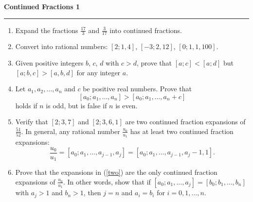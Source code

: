 \documentclass[12pt]{article}
\begin{document}
\begin{center}
{\bf \Large Continued Fractions 1}
\vspace{0.2cm}
\hrule
\end{center}

\begin{enumerate}
	\item Expand the fractions $\frac{17}{3}$ and $\frac{3}{17}$ into continued fractions.
	\vfill
	\item Convert into rational numbers: $[2; 1, 4]$, $[-3;2, 12]$, $[0;1, 1, 100]$.
	\vfill
	\item Given positive integers $b$, $c$, $d$ with $c>d$, prove that $[a; c]<[a; d]$ but $[a;b,c]>[a,b,d]$ for any integer $a$.
	\vfill
	\item Let $a_1, a_2, \ldots, a_n$ and $c$ be positive real numbers. Prove that
	\[
	[a_0; a_1, \ldots, a_n]>[a_0; a_1, \ldots, a_n+c]
	\]
	holds if $n$ is odd, but is false if $n$ is even.
	\vfill
	\item Verify that $[2;3, 7]$ and $[2;3,6,1]$ are two continued fraction expansions of $\frac{51}{52}$. In general, any rational number $\frac{u_0}{u_1}$ has at least two continued fraction expansions:
	\begin{equation}\label{two}
	\frac{u_0}{u_1} = [a_0; a_1, \ldots, a_{j-1}, a_j] = [a_0;a_1, \ldots, a_{j-1}, a_j-1, 1].
	\end{equation}
	\vfill
	\item Prove that the expansions in (\ref{two}) are the only continued fraction expansions of $\frac{u_0}{u_1}$. In other words, show that if $[a_0;a_1, \ldots, a_j] = [b_0;b_1,\ldots, b_n]$ with $a_j>1$ and $b_n>1$, then $j=n$ and $a_i=b_i$ for $i=0, 1, \ldots, n$.
	\vfill
\end{enumerate}
\end{document}

